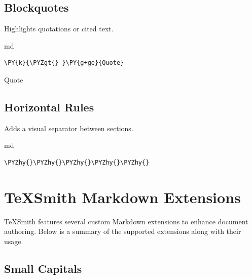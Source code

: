 \documentclass[a4paper,twoside]{article}
\begin{document}
\subsection{Blockquotes}\label{blockquotes}

Highlights quotations or cited text.

\begin{code}{md}{}{}
\begin{Verbatim}[commandchars=\\\{\},breaklines, breakanywhere, commandchars=\\\{\}]
\PY{k}{\PYZgt{} }\PY{g+ge}{Quote}
\end{Verbatim}
\end{code}
\begin{displayquote}

Quote

\end{displayquote}
\subsection{Horizontal Rules}\label{horizontal-rules}

Adds a visual separator between sections.

\begin{code}{md}{}{}
\begin{Verbatim}[commandchars=\\\{\},breaklines, breakanywhere, commandchars=\\\{\}]
\PYZhy{}\PYZhy{}\PYZhy{}\PYZhy{}\PYZhy{}
\end{Verbatim}
\end{code}
\begin{displayquote}

\clearpage

\end{displayquote}
\section{TeXSmith Markdown Extensions}\label{texsmith-markdown-extensions}

TeXSmith features several custom Markdown extensions to enhance document authoring.
Below is a summary of the supported extensions along with their usage.

\subsection{Small Capitals}\label{small-capitals}
\end{document}

